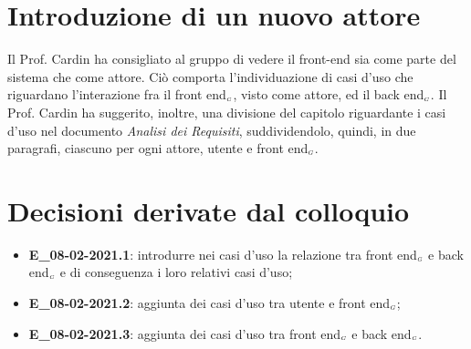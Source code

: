 \section{Introduzione di un nuovo attore}
Il Prof. Cardin ha consigliato al gruppo di vedere il front-end sia come parte del sistema che come attore. Ciò comporta l'individuazione di casi d'uso che riguardano l'interazione fra il front end$_{\scaleto{G}{3pt}}$, visto come attore, ed il back end$_{\scaleto{G}{3pt}}$. Il Prof. Cardin ha suggerito, inoltre, una divisione del capitolo riguardante i casi d'uso nel documento \textit{Analisi dei Requisiti}, suddividendolo, quindi, in due paragrafi, ciascuno per ogni attore, utente e front end$_{\scaleto{G}{3pt}}$.
\section{Decisioni derivate dal colloquio}
\begin{itemize}
	\item \textbf{E\_08-02-2021.1}: introdurre nei casi d'uso la relazione tra front end$_{\scaleto{G}{3pt}}$ e back end$_{\scaleto{G}{3pt}}$ e di conseguenza i loro relativi casi d'uso;
	\item \textbf{E\_08-02-2021.2}: aggiunta dei casi d'uso tra utente e front end$_{\scaleto{G}{3pt}}$;
	\item \textbf{E\_08-02-2021.3}: aggiunta dei casi d'uso tra front end$_{\scaleto{G}{3pt}}$ e back end$_{\scaleto{G}{3pt}}$.
\end{itemize}
